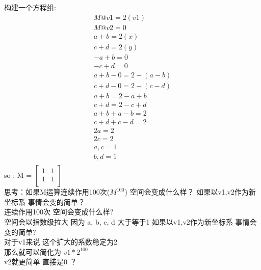 \documentclass[12pt]{article}
\begin{document}
\begin{flushleft}
    构建一个方程组: \\
    \begin{align}
        M @ v1 = 2(v1)           \\
        M @ v2 = 0               \\
        a + b = 2 (x)            \\
        c + d = 2 (y)            \\
        -a + b  = 0              \\
        -c + d  = 0              \\
        a + b - 0 =  2 - (a - b) \\
        c + d - 0 = 2 - (c - d)  \\
        a + b  = 2 - a + b       \\
        c + d  = 2 - c + d       \\
        a + b + a - b = 2        \\
        c + d + c - d  = 2       \\
        2a = 2                   \\
        2c = 2                   \\
        a, c = 1                 \\
        b, d = 1                 \\
    \end{align}
    so :  M = $\begin{bmatrix}
            1 & 1 \\
            1 & 1 \\
        \end{bmatrix}$\\
    思考：如果M运算连续作用100次($M^{100}$) 空间会变成什么样？ 如果以v1,v2作为新坐标系
    事情会变的简单？ \\
    连续作用100次 空间会变成什么样? \\
    空间会以指数级拉大 因为 a, b, c, d 大于等于1
    如果以v1,v2作为新坐标系
    事情会变的简单? \\
    对于v1来说 这个扩大的系数稳定为2\\
    那么就可以简化为 $v1 * 2^{100}$ \\
    v2就更简单 直接是0 ？

\end{flushleft}
\end{document}

